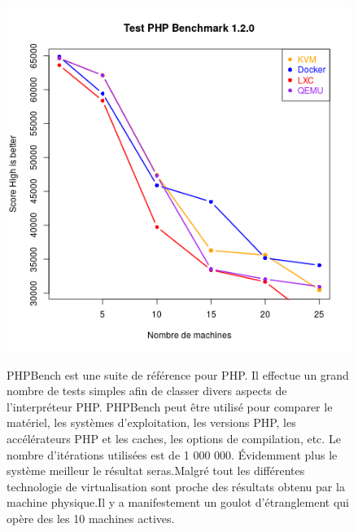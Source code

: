 \begin{figure}[h]
   \begin{minipage}[c]{.46\linewidth}
	   \includegraphics[scale=0.5]{resultats/phpbench.png}
   \end{minipage} \hfill
   \begin{minipage}[c]{.46\linewidth}
      	PHPBench est une suite de référence pour PHP. Il effectue un grand nombre de tests simples afin de classer divers aspects de l'interpréteur PHP. PHPBench peut être utilisé pour comparer le matériel, les systèmes d'exploitation, les versions PHP, les accélérateurs PHP et les caches, les options de compilation, etc. Le nombre d'itérations utilisées est de 1 000 000.
Évidemment plus le système meilleur le résultat seras.Malgré tout les différentes technologie de virtualisation sont proche des résultats obtenu par la machine physique.Il y a manifestement un goulot d’étranglement qui opère des les 10 machines actives.
   \end{minipage}
\end{figure}